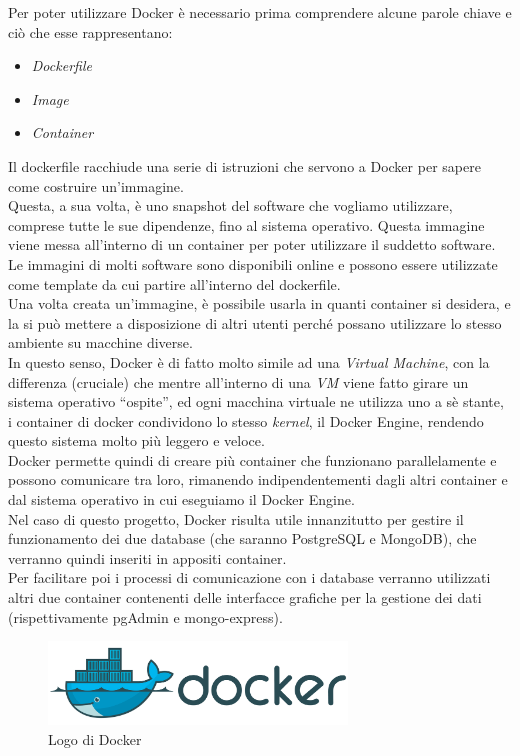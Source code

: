 \noindent Per poter utilizzare Docker è necessario prima comprendere alcune parole chiave e ciò che esse rappresentano\cite{site:fireshipdocker}:
\begin{itemize}
    \item \textit{Dockerfile}
    \item \textit{Image}
    \item \textit{Container}
\end{itemize}
Il dockerfile racchiude una serie di istruzioni che servono a Docker per sapere come costruire un'immagine.\\
Questa, a sua volta, è uno snapshot del software che vogliamo utilizzare, comprese tutte le sue dipendenze, fino al sistema operativo. Questa immagine viene messa all'interno di un container per poter utilizzare il suddetto software.\\
Le immagini di molti software sono disponibili online e possono essere utilizzate come template da cui partire all'interno del dockerfile.\\
Una volta creata un'immagine, è possibile usarla in quanti container si desidera, e la si può mettere a disposizione di altri utenti perché possano utilizzare lo stesso ambiente su macchine diverse.\\
In questo senso, Docker è di fatto molto simile ad una \textit{Virtual Machine}, con la differenza (cruciale) che mentre all'interno di una \textit{VM} viene fatto girare un sistema operativo ``ospite'', ed ogni macchina virtuale ne utilizza uno a sè stante, i container di docker condividono lo stesso \textit{kernel}, il Docker Engine, rendendo questo sistema molto più leggero e veloce.\\
Docker permette quindi di creare più container che funzionano parallelamente e possono comunicare tra loro, rimanendo indipendentementi dagli altri container e dal sistema operativo in cui eseguiamo il Docker Engine.\\

\noindent Nel caso di questo progetto, Docker risulta utile innanzitutto per gestire il funzionamento dei due database (che saranno PostgreSQL e MongoDB), che verranno quindi inseriti in appositi container.\\
Per facilitare poi i processi di comunicazione con i database verranno utilizzati altri due container contenenti delle interfacce grafiche per la gestione dei dati (rispettivamente pgAdmin e mongo-express).

\begin{figure}[htbp]
\begin{center}
\includegraphics[height=6em]{immagini/tecnologies-logos/Docker-Logo.png}
\caption{Logo di Docker}
\label{fig:docker}
\end{center}
\end{figure}


